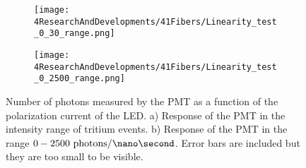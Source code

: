 \begin{figure}
\centering
    \begin{subfigure}[b]{1\textwidth}
    \centering
    \texttt{[image: 4ResearchAndDevelopments/41Fibers/Linearity\_test\_0\_30\_range.png]}  
    \caption{\label{subfig:LinearityTritiumRange}}
    \end{subfigure}
    \hfill
    \begin{subfigure}[b]{1\textwidth}
    \centering
    \texttt{[image: 4ResearchAndDevelopments/41Fibers/Linearity\_test\_0\_2500\_range.png]}  
    \caption{\label{subfig:LinearityStudyRange}}
    \end{subfigure}
 \caption{Number of photons measured by the PMT as a function of the polarization current of the LED. a) Response of the PMT in the intensity range of tritium events. b) Response of the PMT in the range $0-2500~\text{photons}/\nano\second$. Error bars are included but they are too small to be visible.}
 \label{fig:LinearityRangesOfPMT}
\end{figure}